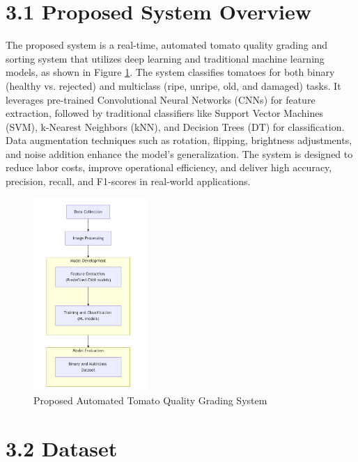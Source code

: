 \documentclass[12pt,a4paper]{report}
\begin{document}
	\section*{3.1 Proposed System Overview}
\hspace{1cm}The proposed system is a real-time, automated tomato quality grading and sorting system that utilizes deep learning and traditional machine learning models, as shown in Figure \ref{fig:proposed_system}. The system classifies tomatoes for both binary (healthy vs. rejected) and multiclass (ripe, unripe, old, and damaged) tasks. It leverages pre-trained Convolutional Neural Networks (CNNs) for feature extraction, followed by traditional classifiers like Support Vector Machines (SVM), k-Nearest Neighbors (kNN), and Decision Trees (DT) for classification. Data augmentation techniques such as rotation, flipping, brightness adjustments, and noise addition enhance the model's generalization. The system is designed to reduce labor costs, improve operational efficiency, and deliver high accuracy, precision, recall, and F1-scores in real-world applications.
	
	\begin{figure}[htbp]
		\renewcommand\thefigure{3.1}
		 \centering \includegraphics[width=0.385\textwidth]{DOC/flow.png} \caption{Proposed Automated Tomato Quality Grading System} \label{fig:proposed_system} \end{figure}
	
	\section*{3.2 Dataset}
	
\end{document}
